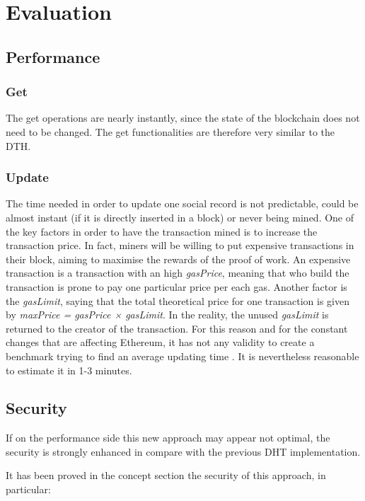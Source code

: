 \chapter{Evaluation}
\label{evaluation}

\section{Performance}

\subsection{Get}
The get operations are nearly instantly, since the state of the blockchain does not need to be changed.
The get functionalities are therefore very similar to the DTH.

\subsection{Update}
The time needed in order to update one social record is not predictable, could be almost instant (if it is directly inserted in a block) or never being mined.
One of the key factors in order to have the transaction mined is to increase the transaction price.
In fact, miners will be willing to put expensive transactions in their block, aiming to maximise the rewards of the proof of work.
An expensive transaction is a transaction with an high \textit{gasPrice}, meaning that who build the transaction is prone to pay one particular price per each gas.
Another factor is the \textit{gasLimit}, saying that the total theoretical price for one transaction is given by \textit{maxPrice = gasPrice × gasLimit}.
In the reality, the unused \textit{gasLimit} is returned to the creator of the transaction.
For this reason and for the constant changes that are affecting Ethereum, it has not any validity to create a benchmark trying to find an average updating time \cite{miningTime}.
It is nevertheless reasonable to estimate it in 1-3 minutes.

\section{Security}

If on the performance side this new approach may appear not optimal, the security is strongly enhanced in compare with the previous DHT implementation.

It has been proved in the concept section the security of this approach, in particular:

